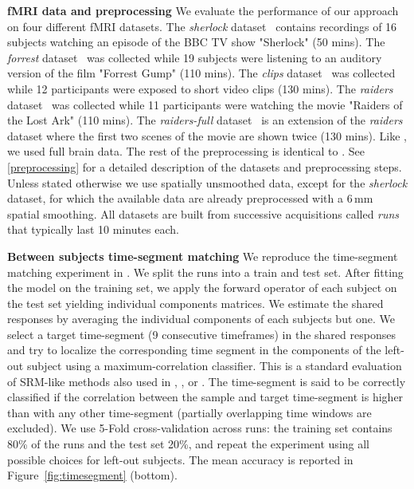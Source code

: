 \textbf{fMRI data and preprocessing} 
We evaluate the performance of our approach on four different fMRI datasets.
%
The \emph{sherlock} dataset~\cite{chen2017shared} contains recordings of 16 subjects watching an episode of the BBC TV show "Sherlock" (50 mins).
%
The \emph{forrest} dataset~\cite{hanke2014high} was collected while 19 subjects were listening to an auditory version of the film "Forrest Gump" (110 mins).
%
The \emph{clips} dataset~\cite{ibc} was collected while 12 participants were exposed to short video clips (130 mins).
%
The \emph{raiders} dataset~\cite{ibc} was collected while 11 participants were watching the movie "Raiders of the Lost Ark" (110 mins).
%
The \emph{raiders-full} dataset~\cite{ibc} is an extension of the \emph{raiders} dataset where the first two scenes of the movie are shown twice (130 mins).
%
Like \cite{zhang2016searchlight}, we used full brain data. The rest of the preprocessing is identical to \cite{chen2017shared}. See \ref{preprocessing} for a detailed description of the datasets and preprocessing steps. Unless stated otherwise we use spatially unsmoothed data, except for the \emph{sherlock} dataset, for which the available data are already preprocessed with a 6\,mm spatial smoothing. All datasets are built from successive acquisitions called \emph{runs} that typically last 10 minutes each.
%

\textbf{Between subjects time-segment matching} 
\label{timesegment_expe}
We reproduce the time-segment matching experiment in
\cite{chen2015reduced}. 
We split the runs into a train and test set. After fitting the model on the training set, we apply the forward operator of each subject on the test set yielding individual components matrices. We estimate the shared responses by averaging the individual components of each subjects but one.  We select a target time-segment (9 consecutive timeframes) in the shared responses and try to localize the corresponding time segment in the components of the left-out subject using a maximum-correlation classifier.
This is a standard evaluation of SRM-like methods also used in  \cite{chen2015reduced}, \cite{guntupalli2018computational}, \cite{Nastase741975} or
\cite{zhang2016searchlight}.
%
The time-segment is said to be
correctly classified if the correlation between the sample and target
time-segment is higher than with any other time-segment (partially overlapping time windows are excluded).
%
We use 5-Fold cross-validation across runs: the training set contains 80\% of the runs and the test set 20\%, and repeat the experiment using all possible choices for left-out subjects. 
%
The mean accuracy is reported in Figure~\ref{fig:timesegment} (bottom). 
%

